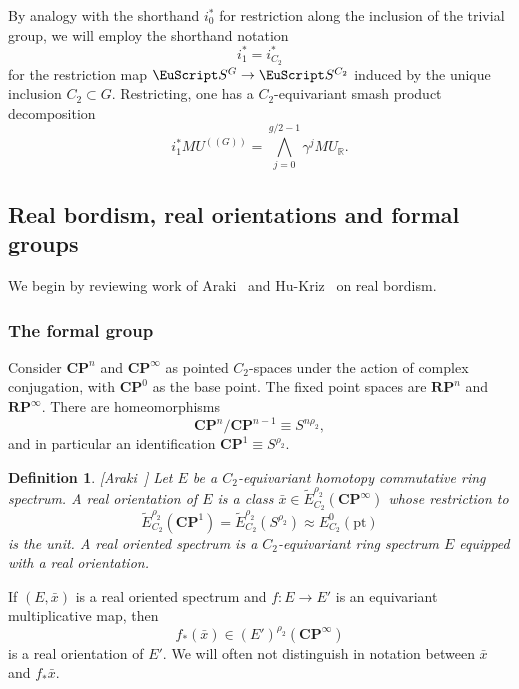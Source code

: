 \documentclass{amsart}
\newtheorem{definition}[equation]{Definition}
\newenvironment{defin}{\begin{definition}\rm}{\end{definition}}
\theoremstyle{definition}
\newtheorem{defin}[equation]{Definition}
\theoremstyle{remark}
\newcommand{\R}{{\mathbb R}}
\newcommand{\cp}{\mathbf{CP}}
\newcommand{\rp}{\mathbf{RP}}
\newcommand{\spectra}{\EuScript S}
\newcommand{\mur}{MU_{\R}}
\newcommand{\mutn}[1]{MU^{(\!(#1)\!)}}
\newcommand{\gbar}{\bar}
\newcommand{\ugspectra}[1]{\spectra^{#1}}
\newcommand{\zt}{C_{2}}
\begin{document}
By analogy with the shorthand $i_{0}^{\ast}$ for restriction along the
inclusion of the trivial group, we will employ the shorthand notation
\[
i_{1}^{\ast} = i_{\zt}^{\ast}
\]
for the restriction map $\ugspectra{G}\to\ugspectra{\zt}$ induced by
the unique inclusion $\zt\subset G$.  Restricting, one has a
$\zt$-equivariant smash product decomposition
\begin{equation}\label{eq:73}
i_{1}^{\ast}\mutn{G} = \bigwedge_{j=0}^{g/2-1} \gamma^{j}\mur.
\end{equation}

\subsection{Real bordism, real orientations and formal groups}
\label{sec:real-bordism-real}

We begin by reviewing work of Araki~\cite{MR614829} and
Hu-Kriz~\cite{MR1808224} on real bordism.

\subsubsection{The formal group}
\label{sec:formal-group}

Consider $\cp^{n}$ and $\cp^{\infty}$ as pointed $\zt$-spaces under
the action of complex conjugation, with $\cp^{0}$ as the base point.
The fixed point spaces are $\rp^{n}$ and $\rp^{\infty}$.  There are
homeomorphisms
\begin{equation}\label{eq:28}
\cp^{n}/\cp^{n-1}\equiv S^{n\rho_{2}},
\end{equation}
and in particular an identification $\cp^{1}\equiv S^{\rho_{2}}$.

\begin{defin}[Araki~\cite{MR614829}]
\label{def:4} Let $E$ be a $\zt$-equivariant homotopy commutative ring
spectrum.  A {\em real orientation} of $E$ is a class $\gbar{x}\in
\tilde E_{\zt}^{\rho_{2}}(\cp^{\infty})$ whose restriction to
\[
\tilde E_{\zt}^{\rho_{2}}(\cp^{1})
=\tilde E_{\zt}^{\rho_{2}}(S^{\rho_{2}})
\approx E_{\zt}^{0}(\text{pt})
\]
is the unit.  A {\em real oriented spectrum} is a
$\zt$-equivariant ring spectrum $E$ equipped with a real orientation.
\end{defin}

If $(E,\gbar{x})$ is a real oriented spectrum and $f:E\to E'$ is an equivariant
multiplicative map, then 
\[
f_{\ast}(\gbar{x})\in (E')^{\rho_{2}}(\cp^{\infty})
\]
is a real orientation of $E'$.  We will often not distinguish in
notation between $\gbar{x}$ and $f_{\ast}\gbar{x}$.
\end{document}
